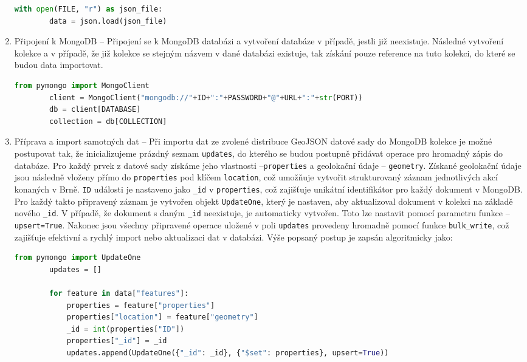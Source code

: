 \documentclass[a4paper, 11pt]{article}
\begin{document}
\begin{enumerate}
\begin{lstlisting}[style=Python, language=Python, framesep=10pt]
        with open(FILE, "r") as json_file:
        data = json.load(json_file)
        \end{lstlisting}
        \item Připojení k MongoDB -- Připojení se k MongoDB databázi a vytvoření databáze v případě, jestli již neexistuje. Následné vytvoření kolekce a v případě, že již kolekce se stejným názvem v dané databázi existuje, tak  získání pouze reference na tuto kolekci, do které se budou data importovat.
        \begin{lstlisting}[style=Python, language=Python, framesep=10pt]
        from pymongo import MongoClient
        client = MongoClient("mongodb://"+ID+":"+PASSWORD+"@"+URL+":"+str(PORT))
        db = client[DATABASE]
        collection = db[COLLECTION]
        \end{lstlisting}
        \item Příprava a import samotných dat -- Při importu dat ze zvolené distribuce GeoJSON datové sady do MongoDB kolekce je možné postupovat tak, že inicializujeme prázdný seznam \texttt{updates}, do kterého se budou postupně přidávat operace pro hromadný zápis do databáze. Pro každý prvek z datové sady získáme jeho vlastnosti --\texttt{properties} a geolokační údaje -- \texttt{geometry}. Získané geolokační údaje jsou následně vloženy přímo do \texttt{properties} pod klíčem \texttt{location}, což umožňuje vytvořit strukturovaný záznam jednotlivých akcí konaných v Brně. \texttt{ID} události je nastaveno jako \texttt{\_id} v \texttt{properties}, což zajišťuje unikátní identifikátor pro každý dokument v MongoDB. Pro každý takto připravený záznam je vytvořen objekt \texttt{UpdateOne}, který je nastaven, aby aktualizoval dokument v kolekci na základě nového \texttt{\_id}. V případě, že dokument s daným \texttt{\_id} neexistuje, je automaticky vytvořen. Toto lze nastavit pomocí parametru funkce -- \texttt{upsert=True}. Nakonec jsou všechny připravené operace uložené v poli \texttt{updates} provedeny hromadně pomocí funkce \texttt{bulk\_write}, což zajišťuje efektivní a rychlý import nebo aktualizaci dat v databázi. Výše popsaný postup je zapsán algoritmicky jako:
        \begin{lstlisting}[style=Python, language=Python, framesep=10pt]
        from pymongo import UpdateOne
        updates = []

        for feature in data["features"]:
            properties = feature["properties"]
            properties["location"] = feature["geometry"]
            _id = int(properties["ID"])
            properties["_id"] = _id
            updates.append(UpdateOne({"_id": _id}, {"$set": properties}, upsert=True))


\end{lstlisting}
\end{enumerate}
\end{document}
